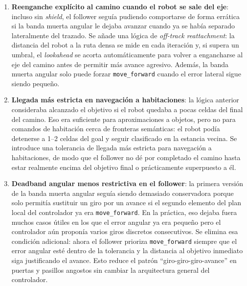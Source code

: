 \begin{enumerate}
  \item \textbf{Reenganche explícito al camino cuando el robot se sale del
        eje}: incluso sin \textit{shield}, el follower seguía pudiendo
        comportarse de forma errática si la banda muerta angular le dejaba
        avanzar cuando ya se había separado lateralmente del trazado. Se añade
        una lógica de \textit{off-track reattachment}: la distancia del robot a
        la ruta densa se mide en cada iteración y, si supera un umbral, el
        \textit{lookahead} se acorta automáticamente para volver a engancharse
        al eje del camino antes de permitir más avance agresivo. Además, la
        banda muerta angular solo puede forzar \texttt{move\_forward} cuando el
        error lateral sigue siendo pequeño.

  \item \textbf{Llegada más estricta en navegación a habitaciones}: la lógica
        anterior consideraba alcanzado el objetivo si el robot quedaba a pocas
        celdas del final del camino. Eso era suficiente para aproximaciones a
        objetos, pero no para comandos de habitación cerca de fronteras
        semánticas: el robot podía detenerse a 1--2 celdas del goal y seguir
        clasificado en la estancia vecina. Se introduce una tolerancia de
        llegada más estricta para navegación a habitaciones, de modo que el
        follower no dé por completado el camino hasta estar realmente encima
        del objetivo final o prácticamente superpuesto a él.

  \item \textbf{Deadband angular menos restrictiva en el follower}: la primera
        versión de la banda muerta angular seguía siendo demasiado conservadora
        porque solo permitía sustituir un giro por un avance si el segundo
        elemento del plan local del controlador ya era \texttt{move\_forward}.
        En la práctica, eso dejaba fuera muchos casos útiles en los que el
        error angular ya era pequeño pero el controlador aún proponía varios
        giros discretos consecutivos. Se elimina esa condición adicional: ahora
        el follower prioriza \texttt{move\_forward} siempre que el error angular
        esté dentro de la tolerancia y la distancia al objetivo inmediato siga
        justificando el avance. Esto reduce el patrón
        ``giro-giro-giro-avance'' en puertas y pasillos angostos sin cambiar la
        arquitectura general del controlador.

\end{enumerate}

